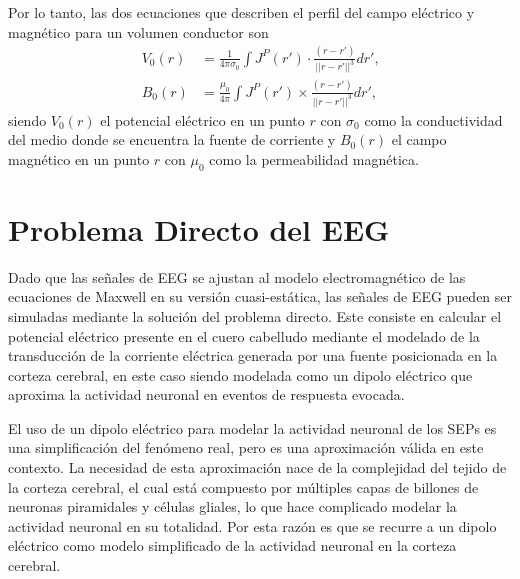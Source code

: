 Por lo tanto, las dos ecuaciones que describen el perfil del campo eléctrico y magnético para un volumen conductor son
\begin{align}
	V_0(r) & = \frac{1}{4\pi\sigma_0} \int J^{P}(r') \cdot \frac{(r - r')}{||r - r'||^3} dr' \text{,} \label{eq:forward1} \\
	B_0(r) & = \frac{\mu_{0}}{4\pi} \int J^{P}(r') \times \frac{(r - r')}{||r - r'||^3} dr' \text{,} \label{eq:forward2}
\end{align}
siendo $V_0(r)$ el potencial eléctrico en un punto $r$ con $\sigma_{0}$ como la conductividad del medio donde se encuentra la fuente de corriente y $B_0(r)$ el campo magnético en un punto $r$ con $\mu_{0}$ como la permeabilidad magnética.

\section{Problema Directo del EEG}
\label{sec:intro:direct}

Dado que las señales de EEG se ajustan al modelo electromagnético de las ecuaciones de Maxwell en su versión cuasi-estática, las señales de EEG pueden ser simuladas mediante la solución del problema directo.
Este consiste en calcular el potencial eléctrico presente en el cuero cabelludo mediante el modelado de la transducción de la corriente eléctrica generada por una fuente posicionada en la corteza cerebral, en este caso siendo modelada como un dipolo eléctrico que aproxima la actividad neuronal en eventos de respuesta evocada.

El uso de un dipolo eléctrico para modelar la actividad neuronal de los SEPs es una simplificación del fenómeno real, pero es una aproximación válida en este contexto.
La necesidad de esta aproximación nace de la complejidad del tejido de la corteza cerebral, el cual está compuesto por múltiples capas de billones de neuronas piramidales y células gliales, lo que hace complicado modelar la actividad neuronal en su totalidad. 
Por esta razón es que se recurre a un dipolo eléctrico como modelo simplificado de la actividad neuronal en la corteza cerebral. 

